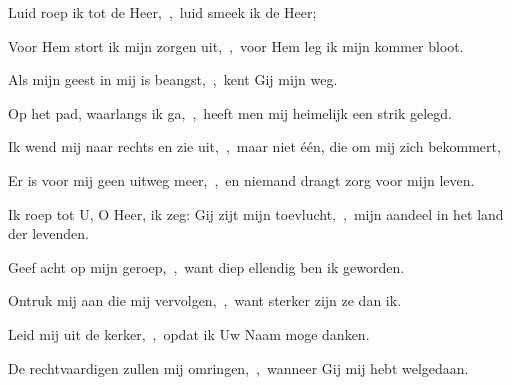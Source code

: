 \documentclass[12pt,twoside,a5paper]{article}
\begin{document}
\begin{halfparskip}
  Luid roep ik tot de Heer,~\sep\ luid smeek ik de Heer;


  Voor Hem stort ik mijn zorgen uit,~\sep\ voor Hem leg ik mijn kommer bloot.

  Als mijn geest in mij is beangst,~\sep\ kent Gij mijn weg.

  Op het pad, waarlangs ik ga,~\sep\ heeft men mij heimelijk een strik gelegd.

  Ik wend mij naar rechts en zie uit,~\sep\ maar niet één, die om mij zich bekommert,

  Er is voor mij geen uitweg meer,~\sep\ en niemand draagt zorg voor mijn leven.

  Ik roep tot U, O Heer, ik zeg: Gij zijt mijn toevlucht,~\sep\ mijn aandeel in het land der levenden.

  Geef acht op mijn geroep,~\sep\ want diep ellendig ben ik geworden.

  Ontruk mij aan die mij vervolgen,~\sep\ want sterker zijn ze dan ik.

  Leid mij uit de kerker,~\sep\ opdat ik Uw Naam moge danken.

  De rechtvaardigen zullen mij omringen,~\sep\ wanneer Gij mij hebt welgedaan.
\end{halfparskip}

\end{document}
